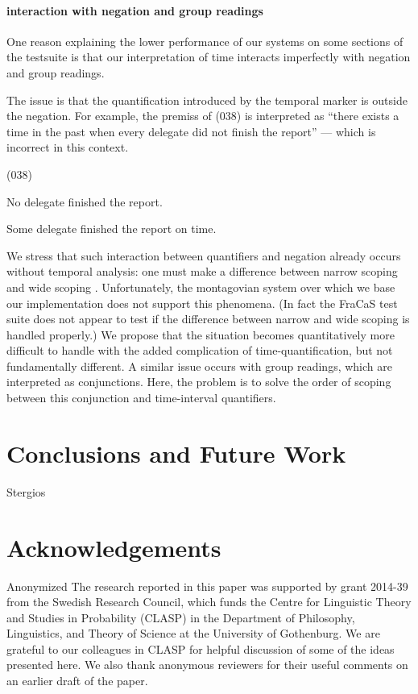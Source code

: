 \documentclass[a4paper,11pt]{article}
\newcommand\hyp{\item[H]}
\newcommand\fracasex[2]{\begin{lingex}\item[(#1)] \begin{subex} #2 \end{subex} \end{lingex} }
\begin{document}
\paragraph{interaction with negation and group readings}
One reason explaining the lower performance of our systems on some
sections of the testsuite is that our interpretation of time interacts
imperfectly with negation and group readings.

The issue is that the quantification introduced by the temporal marker
is outside the negation. For example, the premiss of (038) is
interpreted as ``there exists a time in the past when every delegate
did not finish the report'' --- which is incorrect in this context.
\fracasex{038}{
\item	No delegate finished the report.
\hyp 	Some delegate finished the report on time.
}
%
We stress that such interaction between quantifiers and negation
already occurs without temporal analysis: one must make a difference
between narrow scoping and wide scoping \cite{todo}. Unfortunately,
the montagovian system over which we base our implementation does not
support this phenomena. (In fact the FraCaS test suite does not appear to
test if the difference between narrow and wide scoping is handled properly.)
We propose that the situation becomes
quantitatively more difficult to handle with the added complication of
time-quantification, but not fundamentally different.
%
A similar issue occurs with group readings, which are interpreted as
conjunctions. Here, the problem is to solve the order of scoping
between this conjunction and time-interval quantifiers.

\section{Conclusions and Future Work}
Stergios
\section*{Acknowledgements}

\ifanon
Anonymized
\else
The research reported in this paper was supported by grant 2014-39 from the
Swedish Research Council, which funds the Centre for Linguistic Theory and
Studies in Probability (CLASP) in the Department of Philosophy, Linguistics,
and Theory of Science at the University of Gothenburg. We are grateful to
our colleagues in CLASP for helpful discussion of some of the ideas presented
here. We also thank anonymous reviewers for their useful comments on an
earlier draft of the paper.
\fi

\end{document}
